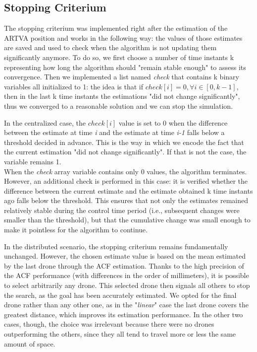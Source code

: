 \subsection{Stopping Criterium}
The stopping criterium was implemented right after the estimation of the ARTVA position and works in the following way: the values of those estimates are saved and used to check when the algorithm is not updating them significantly anymore. To do so, we first choose a number of time instants k representing how long the algorithm should "remain stable enough" to assess its convergence. Then we implemented a list named \textit{check} that contains k binary variables all initialized to 1: the idea is that if $check[i] = 0, \forall i \in [0,k-1]$, then in the last k time instants the estimations "did not change significantly", thus we converged to a reasonable solution and we can stop the simulation.

In the centralized case, the $check[i]$ value is set to 0 when the difference between the estimate at time \textit{i} and the estimate at time \textit{i-1} falls below a threshold decided in advance. This is the way in which we encode the fact that the current estimation "did not change significantly". If that is not the case, the variable remains 1.\\
When the \textit{check} array variable contains only 0 values, the algorithm terminates. However, an additional check is performed in this case: it is verified whether the difference between the current estimate and the estimate obtained k time instants ago falls below the threshold. This ensures that not only the estimates remained relatively stable during the control time period (i.e., subsequent changes were smaller than the threshold), but that the cumulative change was small enough to make it pointless for the algorithm to continue.

In the distributed scenario, the stopping criterium remains fundamentally unchanged. However, the chosen estimate value is based on the mean estimated by the last drone through the ACF estimation. Thanks to the high precision of the ACF performance (with differences in the order of millimeters), it is possible to select arbitrarily any drone. This selected drone then signals all others to stop the search, as the goal has been accurately estimated. We opted for the final drone rather than any other one, as in the "\textit{linear}" case the last drone covers the greatest distance, which improves its estimation performance. In the other two cases, though, the choice was irrelevant because there were no drones outperforming the others, since they all tend to travel more or less the same amount of space.

